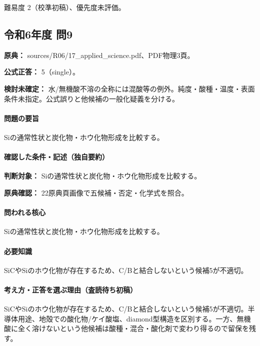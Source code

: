 \par 難易度 2（校準初稿）、優先度未評価。

\subsection{令和6年度 問9}
\label{q:r06-reg-applied-09}

\noindent\textbf{原典：} sources/R06/17\_applied\_science.pdf、PDF物理3頁。

\textbf{公式正答：} 5（single）。

\par\textbf{検討未確定：} 水/無機酸不溶の全称には混酸等の例外。純度・酸種・温度・表面条件未指定。公式誤りと他候補の一般化疑義を分ける。

\paragraph{問題の要旨} Siの通常性状と炭化物・ホウ化物形成を比較する。

\paragraph{確認した条件・記述（独自要約）}\mbox{}\par

\noindent\textbf{判断対象：} Siの通常性状と炭化物・ホウ化物形成を比較する。\par

\noindent\textbf{原典確認：} 22原典頁画像で五候補・否定・化学式を照合。\par

\paragraph{問われる核心} Siの通常性状と炭化物・ホウ化物形成を比較する。

\paragraph{必要知識} SiCやSiのホウ化物が存在するため、C/Bと結合しないという候補5が不適切。

\paragraph{考え方・正答を選ぶ理由（査読待ち初稿）} SiCやSiのホウ化物が存在するため、C/Bと結合しないという候補5が不適切。半導体用途、地殻での酸化物/ケイ酸塩、diamond型構造を区別する。一方、無機酸に全く溶けないという他候補は酸種・混合・酸化剤で変わり得るので留保を残す。

